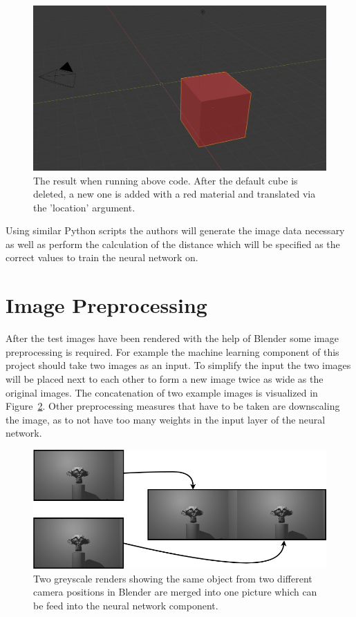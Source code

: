 \begin{figure}[h!]
	\centering
	\includegraphics[width=6.5in]{img/methodology_generatingData_blender_exampleScriptResult.png}
	\caption{The result when running above code. After the default cube is deleted, a new one is added with a red material and translated via the 'location' argument.}
	\label{pic:methodology_generatingData_blender_exampleScriptResult}
\end{figure}

Using similar Python scripts the authors will generate the image data necessary as well as perform the calculation of the distance which will be specified as the correct values to train the neural network on.

\section{Image Preprocessing}
After the test images have been rendered with the help of Blender some image preprocessing is required. For example the machine learning component of this project should take two images as an input. To simplify the input the two images will be placed next to each other to form a new image twice as wide as the original images. The concatenation of two example images is visualized in Figure~\ref{pic:methodology_imagePreprocessing_imageMerge}. Other preprocessing measures that have to be taken are downscaling the image, as to not have too many weights in the input layer of the neural network.

\begin{figure}[h!]
	\centering
	\includegraphics[width=6.5in]{img/methodology_imagePreprocessing_imageMerge.png}
	\caption{Two greyscale renders showing the same object from two different camera positions in Blender are merged into one picture which can be feed into the neural network component.}
	\label{pic:methodology_imagePreprocessing_imageMerge}
\end{figure}

